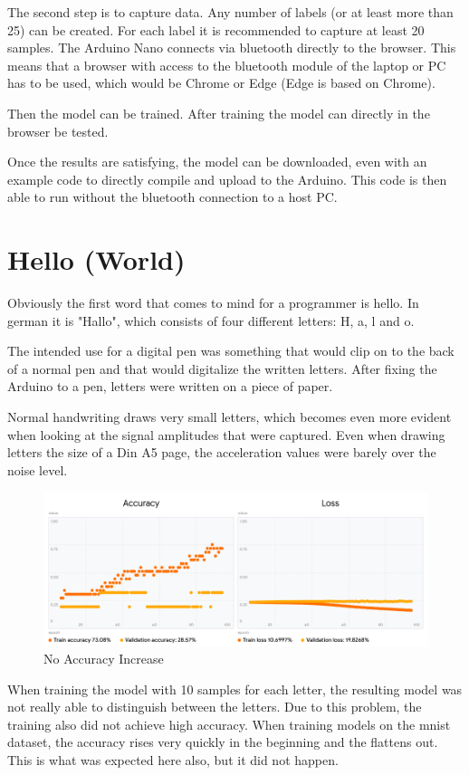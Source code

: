 \documentclass[a4paper,titlepage]{article}
\begin{document}
The second step is to capture data.
Any number of labels (or at least more than 25) can be created.
For each label it is recommended to capture at least 20 samples.
The Arduino Nano connects via bluetooth directly to the browser.
This means that a browser with access to the bluetooth module of the laptop or PC has to be used, which would be Chrome or Edge (Edge is based on Chrome).

Then the model can be trained.
After training the model can directly in the browser be tested.

Once the results are satisfying, the model can be downloaded, even with an example code to directly compile and upload to the Arduino.
This code is then able to run without the bluetooth connection to a host PC.

\newpage
\section{Hello (World)}

Obviously the first word that comes to mind for a programmer is hello.
In german it is "Hallo", which consists of four different letters: H, a, l and o.

The intended use for a digital pen was something that would clip on to the back of a normal pen and that would digitalize the written letters.
After fixing the Arduino to a pen, letters were written on a piece of paper.

Normal handwriting draws very small letters, which becomes even more evident when looking at the signal amplitudes that were captured.
Even when drawing letters the size of a Din A5 page, the acceleration values were barely over the noise level.

\begin{figure}[H]
    \includegraphics[width=\textwidth]{slow_training_start.png}
    \caption{No Accuracy Increase}
\end{figure}

When training the model with 10 samples for each letter, the resulting model was not really able to distinguish between the letters.
Due to this problem, the training also did not achieve high accuracy.
When training models on the mnist dataset, the accuracy rises very quickly in the beginning and the flattens out.
This is what was expected here also, but it did not happen.
\end{document}
